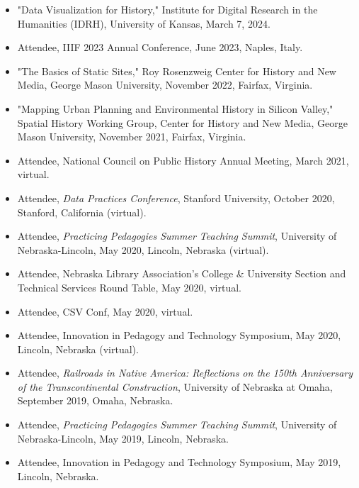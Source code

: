 \documentclass[10pt]{article}
\begin{document}
\begin{itemize}
  \item "Data Visualization for History," Institute for Digital Research in the Humanities (IDRH), University of Kansas, March 7, 2024.
  
  \item Attendee, IIIF 2023 Annual Conference, June 2023, Naples, Italy.
  
  \item "The Basics of Static Sites," Roy Rosenzweig Center for History and New Media, George Mason University, November 2022, Fairfax, Virginia.
  
  \item "Mapping Urban Planning and Environmental History in Silicon Valley," Spatial History Working Group, Center for History and New Media, George Mason University, November 2021, Fairfax, Virginia.
  
  \item Attendee, National Council on Public History Annual Meeting, March 2021, virtual.
  
  \item Attendee, \textit{Data Practices Conference}, Stanford University, October 2020, Stanford, California (virtual).
  
  \item Attendee, \textit{Practicing Pedagogies Summer Teaching Summit}, University of Nebraska-Lincoln, May 2020, Lincoln, Nebraska (virtual).
  
  \item Attendee, Nebraska Library Association's College \& University Section and Technical Services Round Table, May 2020, virtual.
  
  \item Attendee, CSV Conf, May 2020, virtual.
  
  \item Attendee, Innovation in Pedagogy and Technology Symposium, May 2020, Lincoln, Nebraska (virtual).
  
  \item Attendee, \textit{Railroads in Native America: Reflections on the 150th Anniversary of the Transcontinental Construction}, University of Nebraska at Omaha, September 2019, Omaha, Nebraska.
  
  \item Attendee, \textit{Practicing Pedagogies Summer Teaching Summit}, University of Nebraska-Lincoln, May 2019, Lincoln, Nebraska.
  
  \item Attendee, Innovation in Pedagogy and Technology Symposium, May 2019, Lincoln, Nebraska.
  

\end{itemize}
\end{document}
